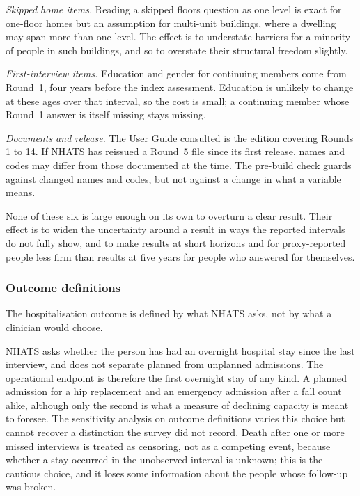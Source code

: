 \emph{Skipped home items.} Reading a skipped floors question as one level is exact
for one-floor homes but an assumption for multi-unit buildings, where a dwelling may
span more than one level. The effect is to understate barriers for a minority of
people in such buildings, and so to overstate their structural freedom slightly.

\emph{First-interview items.} Education and gender for continuing members come from
Round~1, four years before the index assessment. Education is unlikely to change at
these ages over that interval, so the cost is small; a continuing member whose
Round~1 answer is itself missing stays missing.

\emph{Documents and release.} The User Guide consulted is the edition covering
Rounds 1 to 14. If NHATS has reissued a Round~5 file since its first release, names
and codes may differ from those documented at the time. The pre-build check guards
against changed names and codes, but not against a change in what a variable means.

None of these six is large enough on its own to overturn a clear result. Their
effect is to widen the uncertainty around a result in ways the reported intervals do
not fully show, and to make results at short horizons and for proxy-reported people
less firm than results at five years for people who answered for themselves.

\subsubsection{Outcome definitions}

The hospitalisation outcome is defined by what NHATS asks, not by what a clinician
would choose.

NHATS asks whether the person has had an overnight hospital stay since the last
interview, and does not separate planned from unplanned admissions. The operational
endpoint is therefore the first overnight stay of any kind. A planned admission for
a hip replacement and an emergency admission after a fall count alike, although only
the second is what a measure of declining capacity is meant to foresee. The
sensitivity analysis on outcome definitions varies this choice but cannot recover a
distinction the survey did not record. Death after one or more missed interviews is
treated as censoring, not as a competing event, because whether a stay occurred in
the unobserved interval is unknown; this is the cautious choice, and it loses some
information about the people whose follow-up was broken.

